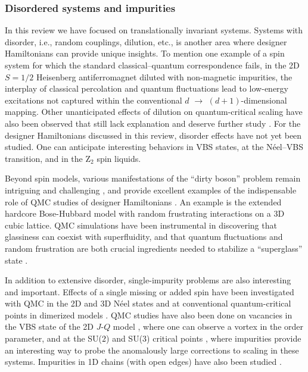 \documentclass[range]{ar2e}
\begin{document}
\subsubsection{Disordered systems and impurities}

In this review we have focused on translationally invariant systems. Systems with disorder, i.e., random couplings, dilution, etc., is another area where designer 
Hamiltonians can provide unique insights. To mention one example of a spin system for which the standard classical--quantum correspondence fails, in the 2D $S=1/2$ 
Heisenberg antiferromagnet diluted with non-magnetic impurities, the interplay of classical percolation and quantum fluctuations lead to low-energy 
excitations \cite{Wang10} not captured \cite{Vojta05} within the conventional $d$ $\to$ $(d+1)$-dimensional mapping. Other unanticipated effects of dilution 
on quantum-critical scaling have also been observed that still lack explanation and deserve further study \cite{Yu06,Roscilde06,Sandvik06,Roscilde07,Yao10}. 
For the designer Hamiltonians discussed in this review, disorder effects have not yet been studied. One can anticipate interesting behaviors in VBS states, 
at the N\'eel--VBS transition, and in the Z$_2$ spin liquids. 

Beyond spin models, various manifestations of the ``dirty boson'' problem remain intriguing and challenging \cite{Pollet09,Meier12,Iyer12}, and provide excellent 
examples of the indispensable role of QMC studies of designer Hamiltonians \cite{Gurarie09}. An example is the extended hardcore Bose-Hubbard model with 
random frustrating interactions on a 3D cubic lattice. QMC simulations have been instrumental in discovering that glassiness can coexist with superfluidity, 
and that quantum fluctuations and random frustration are both crucial ingredients needed to stabilize a ``superglass'' state \cite{superglass1,superglass2}.

In addition to extensive disorder, single-impurity problems are also interesting and important. Effects of a single missing or added spin have been
investigated with QMC in the 2D and 3D N\'eel states \cite{Hoglund04,Liu09} and at conventional quantum-critical points in dimerized models \cite{Hoglund07}. 
QMC studies have also been done on vacancies in the VBS state of the 2D $J$-$Q$ model \cite{Kaul08}, where one can observe a vortex in the order parameter, 
and at the SU($2$) and SU($3$) critical points \cite{banerjee2010:log,banerjee2010:su3}, where impurities provide an interesting way to probe the anomalously 
large corrections to scaling in these systems. Impurities in 1D chains (with open edges) have also been studied \cite{Sanyal11}.
\end{document}
